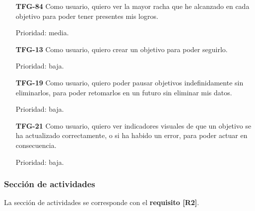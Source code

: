 \documentclass[10pt, a4paper]{aqademic}
\begin{document}
\begin{itemize}[leftmargin=16mm]
	\item [\textbf{TFG-84}] Como usuario, quiero ver la mayor racha que he alcanzado en cada objetivo para poder tener presentes mis logros.
	
	Prioridad: media.
	
	\item [\textbf{TFG-13}] Como usuario, quiero crear un objetivo para poder seguirlo.
	
	Prioridad: baja.
	
	\item [\textbf{TFG-19}] Como usuario, quiero poder pausar objetivos indefinidamente sin eliminarlos, para poder retomarlos en un futuro sin eliminar mis datos.
	
	Prioridad: baja.
	
	\item [\textbf{TFG-21}] Como usuario, quiero ver indicadores visuales de que un objetivo se ha actualizado correctamente, o si ha habido un error, para poder actuar en consecuencia.
	
	Prioridad: baja.
\end{itemize}


\subsubsection*{Sección de actividades}

La sección de actividades se corresponde con el \textbf{requisito [R2]}.
\end{document}
